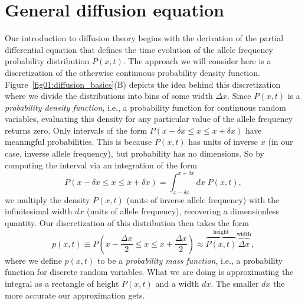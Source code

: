 \section{General diffusion equation}

Our introduction to diffusion theory begins with the derivation of the partial
differential equation that defines the time evolution of the allele frequency
probability distribution $P(x, t)$. The approach we will consider here is a
discretization of the otherwise continuous probability density function.
Figure~\ref{fig01:diffusion_basics}(B) depicts the idea behind this
discretization where we divide the distributions into bins of some width $\Delta
x$. Since $P(x, t)$ is a \textit{probability density function}, i.e., a
probability function for continuous random variables, evaluating this density
for any particular value of the allele frequency returns zero. Only intervals of
the form $P(x - \delta x \leq x \leq x + \delta x)$ have meaningful
probabilities. This is because $P(x, t)$ has units of inverse $x$ (in our case,
inverse allele frequency), but probability has no dimensions. So by computing
the interval via an integration of the form
\begin{equation}
    P(x - \delta x \leq x \leq x + \delta x) =
    \int_{x - \delta x}^{x + \delta x} dx \; P(x, t),
\end{equation}
we multiply the density $P(x, t)$ (units of inverse allele frequency) with the
infinitesimal width $dx$ (units of allele frequency), recovering a dimensionless
quantity. Our discretization of this distribution then takes the form
\begin{equation}
    p(x, t) \equiv P(x - \frac{\Delta x}{2} \leq x \leq x + \frac{\Delta x}{2}) 
    \approx \overbrace{P(x, t)}^{\text{height}} 
    \overbrace{\Delta x}^{\text{width}},
\label{eq:mass_vs_density}
\end{equation}
where we define $p(x, t)$ to be a \textit{probability mass function}, i.e., a
probability function for discrete random variables. What we are doing is
approximating the integral as a rectangle of height $P(x, t)$ and a width $dx$.
The smaller $dx$ the more accurate our approximation gets.

